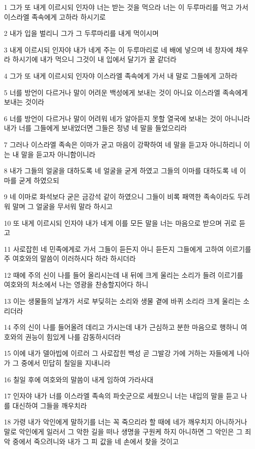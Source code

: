 \par 1 그가 또 내게 이르시되 인자야 너는 받는 것을 먹으라 너는 이 두루마리를 먹고 가서 이스라엘 족속에게 고하라 하시기로
\par 2 내가 입을 벌리니 그가 그 두루마리를 내게 먹이시며
\par 3 내게 이르시되 인자야 내가 네게 주는 이 두루마리로 네 배에 넣으며 네 창자에 채우라 하시기에 내가 먹으니 그것이 내 입에서 달기가 꿀 같더라
\par 4 그가 또 내게 이르시되 인자야 이스라엘 족속에게 가서 내 말로 그들에게 고하라
\par 5 너를 방언이 다르거나 말이 어려운 백성에게 보내는 것이 아니요 이스라엘 족속에게 보내는 것이라
\par 6 너를 방언이 다르거나 말이 어려워 네가 알아듣지 못할 열국에 보내는 것이 아니니라 내가 너를 그들에게 보내었더면 그들은 정녕 네 말을 들었으리라
\par 7 그러나 이스라엘 족속은 이마가 굳고 마음이 강퍅하여 네 말을 듣고자 아니하리니 이는 내 말을 듣고자 아니함이니라
\par 8 내가 그들의 얼굴을 대하도록 네 얼굴을 굳게 하였고 그들의 이마를 대하도록 네 이마를 굳게 하였으되
\par 9 네 이마로 화석보다 굳은 금강석 같이 하였으니 그들이 비록 패역한 족속이라도 두려워 말며 그 얼굴을 무서워 말라 하시고
\par 10 또 내게 이르시되 인자야 내가 네게 이를 모든 말을 너는 마음으로 받으며 귀로 듣고
\par 11 사로잡힌 네 민족에게로 가서 그들이 듣든지 아니 듣든지 그들에게 고하여 이르기를 주 여호와의 말씀이 이러하시다 하라 하시더라
\par 12 때에 주의 신이 나를 들어 올리시는데 내 뒤에 크게 울리는 소리가 들려 이르기를 여호와의 처소에서 나는 영광을 찬송할지어다 하니
\par 13 이는 생물들의 날개가 서로 부딪히는 소리와 생물 곁에 바퀴 소리라 크게 울리는 소리더라
\par 14 주의 신이 나를 들어올려 데리고 가시는데 내가 근심하고 분한 마음으로 행하니 여호와의 권능이 힘있게 나를 감동하시더라
\par 15 이에 내가 델아빕에 이르러 그 사로잡힌 백성 곧 그발강 가에 거하는 자들에게 나아가 그 중에서 민답히 칠일을 지내니라
\par 16 칠일 후에 여호와의 말씀이 내게 임하여 가라사대
\par 17 인자야 내가 너를 이스라엘 족속의 파숫군으로 세웠으니 너는 내입의 말을 듣고 나를 대신하여 그들을 깨우치라
\par 18 가령 내가 악인에게 말하기를 너는 꼭 죽으리라 할 때에 네가 깨우치지 아니하거나 말로 악인에게 일러서 그 악한 길을 떠나 생명을 구원케 하지 아니하면 그 악인은 그 죄악 중에서 죽으려니와 내가 그 피 값을 네 손에서 찾을 것이고
